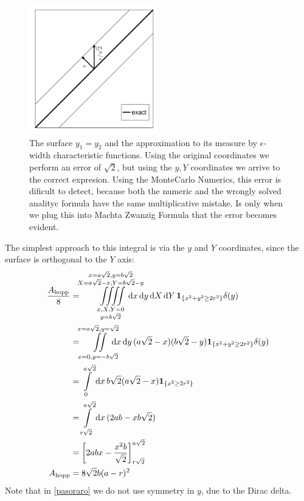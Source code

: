 \documentclass[superscriptaddress,pre,reprint,showpacs,twocolumn]{revtex4-1}
\newcommand{\rd}[1]{\mathrm{d}{#1} \,}
\newcommand{\indicatorsymbol}{\mathbf{1}}
\newcommand{\indicator}[1]{\indicatorsymbol_{ \{   #1 \} } }
\begin{document}
\begin{figure}
\includegraphics[width=0.5\textwidth]{figures/diagramdelta01.pdf}
\caption{The surface $y_1=y_2$ and the approximation to its measure by
  $\epsilon$-width characteristic functions. Using the original coordinates
  we perform an error of $\sqrt{2}$, but using the $y,Y$ coordinates
  we arrive to the correct expresion. Using the MonteCarlo Numerics, this
  error is dificult to detect, because both the numeric and the wrongly solved
  analityc formula have the same multiplicative mistake. Is only when we plug this into
Machta Zwanzig Formula that the error becomes evident. }\label{DiagramaDelta01}
\end{figure}

The simplest approach to this integral is via the $y$ and $Y$
coordinates, since the surface is orthogonal to the $Y$ axis:
  \begin{align} 
    \frac{A_\text{hopp}}{8} & = \iiiint \limits_
      {\substack{x, X, Y=0 \\ y=b\sqrt{2}}}^
               {\substack{x=a\sqrt{2}, y=b\sqrt{2} \\
                   X=a\sqrt{2}-x, Y =b \sqrt{2}-y }}
                \mkern-36mu
     \rd x   \rd y  \rd X   \rd Y
     \indicator{x^2+y^2 \geq 2 r^2} \delta (y)
     \label{pasoraro}
     \\   
     &=  \iint \limits_{x=0, y=-b\sqrt{2}}^{x=a\sqrt{2}, y=\sqrt{2}}
    \mkern-18mu  \rd x \rd y 
    (a\sqrt{2}-x)(b\sqrt{2}-y)
    \indicator{x^2+y^2 \geq 2 r^2} \delta (y)
    \\
    &= \int \limits _0^{a\sqrt{2}} \rd x
    b\sqrt{2} (a\sqrt{2}-x)
    \indicator{x^2\geq 2 r^2}
    \\
    &= \int\limits_{r\sqrt{2}}^{a\sqrt{2}} \rd x
    (2ab-xb\sqrt{2})
    \\
    &=\biggl[2abx-\frac{x^2b}{\sqrt{2}} \biggr]_{r\sqrt{2}}^{a\sqrt{2}}\\
      A_\text{hopp}&=8\sqrt{2}b(a-r)^2
  \end{align}
  Note that in \eqref{pasoraro} we do not use symmetry in
  $y$, due to the Dirac delta.
\end{document}
